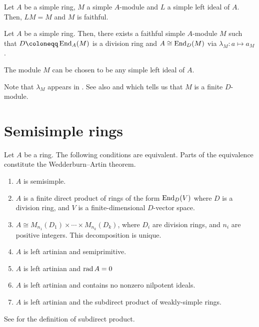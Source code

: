 \documentclass[12pt]{article}
\begin{document}
\begin{thm}
	Let $A$ be a simple ring, $M$ a simple $A$-module and $L$ a simple left ideal of $A$. 
	Then, $LM = M$ and $M$ is faithful.
\end{thm}

\begin{thm} \label{thm:simple-ring-commutant-isomorphism}
	Let $A$ be a simple ring. Then, there exists a faithful simple $A$-module $M$ such that $D \coloneqq \End_{A}(M)$ is a division ring and $A \cong \operatorname{End}_{D}(M)$ via $\lambda_{M} \colon a \mapsto a_{M}$. 

	The module $M$ can be chosen to be any simple left ideal of $A$. 
\end{thm}
Note that $\lambda_{M}$ appears in . 
See also  and  which tells us that $M$ is a finite $D$-module.

\section{Semisimple rings}

\begin{thm} \label{thm:semisimple-ring-equivalences}
	Let $A$ be a ring. The following conditions are equivalent. Parts of the equivalence constitute the Wedderburn--Artin theorem.
	\begin{enumerate}[label=(\alph*)]
		\item $A$ is semisimple.
		\item $A$ is a finite direct product of rings of the form $\operatorname{End}_{D}(V)$ where $D$ is a division ring, and $V$ is a finite-dimensional $D$-vector space.
		\item $A \cong M_{n_{1}}(D_{1}) \times \cdots \times M_{n_{k}}(D_{k})$, where $D_{i}$ are division rings, and $n_{i}$ are positive integers. \newline
		This decomposition is unique.
		\item $A$ is left artinian and semiprimitive.
		\item $A$ is left artinian and $\operatorname{rad} A = 0$
		\item $A$ is left artinian and contains no nonzero nilpotent ideals.
		\item $A$ is left artinian and the subdirect product of weakly-simple rings.
	\end{enumerate}
\end{thm}
See  for the definition of subdirect product.
\end{document}
